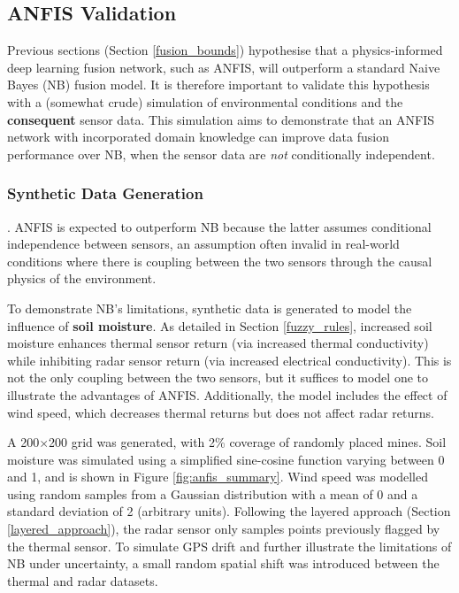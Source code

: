 \subsection{ANFIS Validation} \label{compvis_anfisvalid}

Previous sections (Section \ref{fusion_bounds}) hypothesise that a physics-informed deep learning fusion network, such as ANFIS, will outperform a standard Naive Bayes (NB) fusion model. It is therefore important to validate this hypothesis with a (somewhat crude) simulation of environmental conditions and the \textbf{consequent} sensor data. This simulation aims to demonstrate that an ANFIS network with incorporated domain knowledge can improve data fusion performance over NB, when the sensor data are \textit{not} conditionally independent.

\subsubsection{Synthetic Data Generation}  
.
    ANFIS is expected to outperform NB because the latter assumes conditional independence between sensors, an assumption often invalid in real-world conditions where there is coupling between the two sensors through the causal physics of the environment. 
    
    To demonstrate NB's limitations, synthetic data is generated to model the influence of \textbf{soil moisture}. As detailed in Section \ref{fuzzy_rules}, increased soil moisture enhances thermal sensor return (via increased thermal conductivity) while inhibiting radar sensor return (via increased electrical conductivity). This is not the only coupling between the two sensors, but it suffices to model one to illustrate the advantages of ANFIS. Additionally, the model includes the effect of wind speed, which decreases thermal returns but does not affect radar returns.


    A 200$\times$200 grid was generated, with 2\% coverage of randomly placed mines. Soil moisture was simulated using a simplified sine-cosine function varying between 0 and 1, and is shown in Figure \ref{fig:anfis_summary}. Wind speed was modelled using random samples from a Gaussian distribution with a mean of 0 and a standard deviation of 2 (arbitrary units). Following the layered approach (Section \ref{layered_approach}), the radar sensor only samples points previously flagged by the thermal sensor. To simulate GPS drift and further illustrate the limitations of NB under uncertainty, a small random spatial shift was introduced between the thermal and radar datasets.



